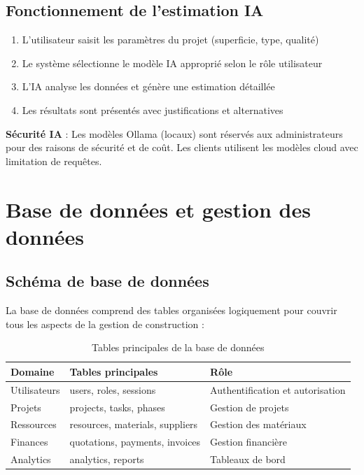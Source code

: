 \documentclass[12pt, a4paper]{report}
\begin{document}
\subsection{Fonctionnement de l'estimation IA}

\begin{enumerate}
    \item L'utilisateur saisit les paramètres du projet (superficie, type, qualité)
    \item Le système sélectionne le modèle IA approprié selon le rôle utilisateur
    \item L'IA analyse les données et génère une estimation détaillée
    \item Les résultats sont présentés avec justifications et alternatives
\end{enumerate}

\begin{warningbox}
\textbf{Sécurité IA} : Les modèles Ollama (locaux) sont réservés aux administrateurs pour des raisons de sécurité et de coût. Les clients utilisent les modèles cloud avec limitation de requêtes.
\end{warningbox}

\section{Base de données et gestion des données}

\subsection{Schéma de base de données}

La base de données comprend des tables organisées logiquement pour couvrir tous les aspects de la gestion de construction :

\begin{table}[H]
\centering
\caption{Tables principales de la base de données}
\begin{tabular}{|l|l|l|}
\hline
\textbf{Domaine} & \textbf{Tables principales} & \textbf{Rôle} \\
\hline
Utilisateurs & users, roles, sessions & Authentification et autorisation \\
\hline
Projets & projects, tasks, phases & Gestion de projets \\
\hline
Ressources & resources, materials, suppliers & Gestion des matériaux \\
\hline
Finances & quotations, payments, invoices & Gestion financière \\
\hline
Analytics & analytics, reports & Tableaux de bord \\
\hline
\end{tabular}
\end{table}
\end{document}
